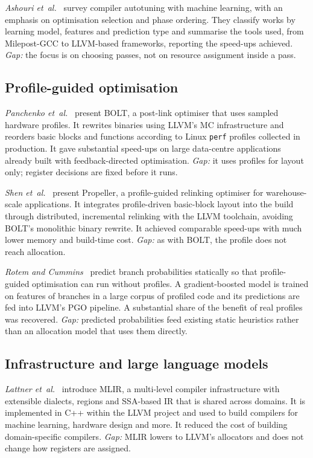 \documentclass[conference]{IEEEtran}
\begin{document}
\textit{Ashouri et~al.}~\cite{ashouri2018survey} survey compiler
autotuning with machine learning, with an emphasis on optimisation
selection and phase ordering. They classify works by learning model,
features and prediction type and summarise the tools used, from
Milepost-GCC to LLVM-based frameworks, reporting the speed-ups achieved.
\textit{Gap:} the focus is on choosing passes, not on resource
assignment inside a pass.

\subsection{Profile-guided optimisation}

\textit{Panchenko et~al.}~\cite{panchenko2019bolt} present BOLT, a
post-link optimiser that uses sampled hardware profiles. It rewrites
binaries using LLVM's MC infrastructure and reorders basic blocks and
functions according to Linux \texttt{perf} profiles collected in
production. It gave substantial speed-ups on large data-centre
applications already built with feedback-directed optimisation.
\textit{Gap:} it uses profiles for layout only; register decisions are
fixed before it runs.

\textit{Shen et~al.}~\cite{shen2023propeller} present Propeller, a
profile-guided relinking optimiser for warehouse-scale applications. It
integrates profile-driven basic-block layout into the build through
distributed, incremental relinking with the LLVM toolchain, avoiding
BOLT's monolithic binary rewrite. It achieved comparable speed-ups with
much lower memory and build-time cost. \textit{Gap:} as with BOLT, the
profile does not reach allocation.

\textit{Rotem and Cummins}~\cite{rotem2021pgo} predict branch
probabilities statically so that profile-guided optimisation can run
without profiles. A gradient-boosted model is trained on features of
branches in a large corpus of profiled code and its predictions are fed
into LLVM's PGO pipeline. A substantial share of the benefit of real
profiles was recovered. \textit{Gap:} predicted probabilities feed
existing static heuristics rather than an allocation model that uses
them directly.

\subsection{Infrastructure and large language models}

\textit{Lattner et~al.}~\cite{lattner2021mlir} introduce MLIR, a
multi-level compiler infrastructure with extensible dialects, regions
and SSA-based IR that is shared across domains. It is implemented in
C++ within the LLVM project and used to build compilers for machine
learning, hardware design and more. It reduced the cost of building
domain-specific compilers. \textit{Gap:} MLIR lowers to LLVM's
allocators and does not change how registers are assigned.
\end{document}
